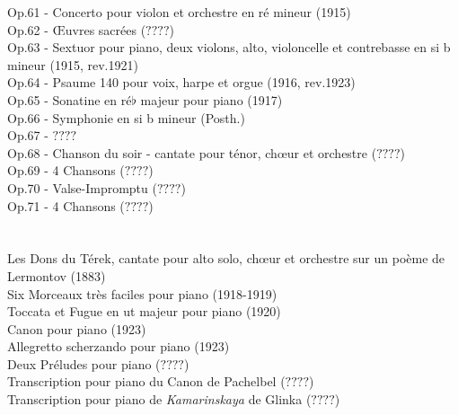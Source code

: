 Op.61 - Concerto pour violon et orchestre en ré mineur (1915)\\
Op.62 - Œuvres sacrées ($????$)\\
Op.63 - Sextuor pour piano, deux violons, alto, violoncelle et contrebasse en si b mineur (1915, rev.1921)\\
Op.64 - Psaume 140 pour voix, harpe et orgue (1916, rev.1923)\\
Op.65 - Sonatine en ré$\flat$ majeur pour piano (1917)\\
Op.66 - Symphonie  en si b mineur (Posth.)\\
Op.67 - $????$\\
Op.68 - Chanson du soir - cantate pour ténor, chœur et orchestre ($????$)\\
Op.69 - 4 Chansons ($????$)\\
Op.70 - Valse-Impromptu  ($????$)\\
Op.71 - 4 Chansons ($????$)\\

\\
\\
Les Dons du Térek, cantate pour alto solo, chœur et orchestre sur un poème de Lermontov (1883)\\
Six Morceaux très faciles pour piano (1918-1919)\\
Toccata et Fugue en ut majeur pour piano (1920)\\
Canon pour piano (1923)\\
Allegretto scherzando pour piano (1923)\\
Deux Préludes pour piano ($????$)\\
Transcription pour piano du Canon de Pachelbel ($????$)\\
Transcription pour piano de \emph{Kamarinskaya} de Glinka ($????$)\\

